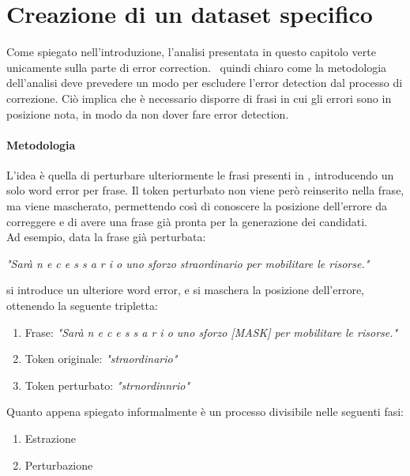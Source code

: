 \section{Creazione di un dataset specifico}
\label{sec:ana_dst}
Come spiegato nell'introduzione, l'analisi presentata in questo capitolo verte unicamente sulla parte di error correction. \E\ quindi chiaro come la metodologia dell'analisi deve prevedere un modo per escludere l'error detection dal processo di correzione. Ciò implica che è necessario disporre di frasi in cui gli errori sono in posizione nota, in modo da non dover fare error detection.

\paragraph{Metodologia} L'idea è quella di perturbare ulteriormente le frasi presenti in \dstb, introducendo un solo word error per frase. Il token perturbato non viene però reinserito nella frase, ma viene mascherato, permettendo così di conoscere la posizione dell'errore da correggere e di avere una frase già pronta per la generazione dei candidati.\\
Ad esempio, data la frase già perturbata:
\begin{center}
\textit{"Sarà n e c e s s a r i o uno sforzo straordinario per mobilitare le risorse."}
\end{center}
si introduce un ulteriore word error, e si maschera la posizione dell'errore, ottenendo la seguente tripletta:
\begin{enumerate}
\item Frase: \textit{"Sarà n e c e s s a r i o uno sforzo [MASK] per mobilitare le risorse."}
\item Token originale: \textit{"straordinario"}
\item Token perturbato: \textit{"strnordinnrio"}
\end{enumerate}
Quanto appena spiegato informalmente è un processo divisibile nelle seguenti fasi:
\begin{enumerate}
\item Estrazione
\item Perturbazione
\end{enumerate}

